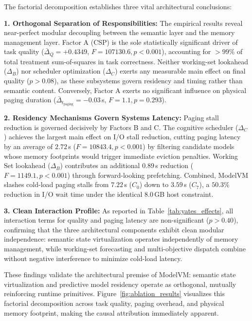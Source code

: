 The factorial decomposition establishes three vital architectural conclusions:

\textbf{1. Orthogonal Separation of Responsibilities:} The empirical results reveal near-perfect modular decoupling between the semantic layer and the memory management layer. Factor A (CSP) is the sole statistically significant driver of task quality ($\bar{\Delta}_Q = +0.4349$, $F = 107130.6, p < 0.001$), accounting for $>99\%$ of total treatment sum-of-squares in task correctness. Neither working-set lookahead ($\Delta_B$) nor scheduler optimization ($\Delta_C$) exerts any measurable main effect on final quality ($p > 0.08$), as these subsystems govern residency and timing rather than semantic content. Conversely, Factor A exerts no significant influence on physical paging duration ($\bar{\Delta}_{t_{\text{paging}}} = -0.03$\,s, $F = 1.1, p = 0.293$).

\textbf{2. Residency Mechanisms Govern Systems Latency:} Paging stall reduction is governed decisively by Factors B and C. The cognitive scheduler ($\Delta_C$) achieves the largest main effect on I/O stall reduction, cutting paging latency by an average of $2.72$\,s ($F = 10843.4, p < 0.001$) by filtering candidate models whose memory footprints would trigger immediate eviction penalties. Working Set lookahead ($\Delta_B$) contributes an additional $0.89$\,s reduction ($F = 1149.1, p < 0.001$) through forward-looking prefetching. Combined, ModelVM slashes cold-load paging stalls from $7.22$\,s ($C_0$) down to $3.59$\,s ($C_7$), a $50.3\%$ reduction in I/O wait time under the identical 8.0\,GB host constraint.

\textbf{3. Clean Interaction Profile:} As reported in Table~\ref{tab:yates_effects}, all interaction terms for quality and paging latency are non-significant ($p > 0.40$), confirming that the three architectural components exhibit clean modular independence: semantic state virtualization operates independently of memory management, while working-set forecasting and multi-objective dispatch combine without negative interference to minimize cold-load latency.

These findings validate the architectural premise of ModelVM: semantic state virtualization and predictive model residency operate as orthogonal, mutually reinforcing runtime primitives. Figure~\ref{fig:ablation_results} visualizes this factorial decomposition across task quality, paging overhead, and physical memory footprint, making the causal attribution immediately apparent.

